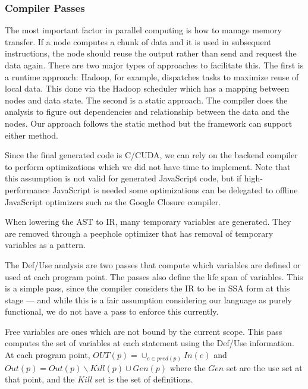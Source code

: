 \subsubsection{Compiler Passes}

The most important factor in parallel computing is how to manage memory
transfer. If a node computes a chunk of data and it is used in
subsequent instructions, the node should reuse the output rather than
send and request the data again. There are two major types of approaches to
facilitate
this. The first is a runtime approach: Hadoop, for example, dispatches
tasks to maximize reuse of local data. This done via the Hadoop
scheduler which has a mapping between nodes and data state.
The second is a static approach. The compiler does the analysis to figure out
dependencies and relationship between the data and the nodes. Our approach
follows the static method but the framework can support either method.
 
Since the final generated code is C/CUDA, we can rely on the backend compiler
	to perform optimizations which we did not have time
	to implement.
Note that this assumption is not valid for generated
	JavaScript code, but if high-performance JavaScript is needed
        some optimizations
	can be delegated to offline JavaScript optimizers such as the
	Google Closure\cite{bolin2010closure} compiler.



When lowering the AST to IR, many temporary variables are generated.
They are removed through a peephole optimizer that has removal of
	temporary variables as a pattern.


The Def/Use analysis are two passes that compute which variables are defined
	or used at each program point.
The passes also define the life span of variables.
This is a simple pass, since the compiler considers the IR to be in SSA form
 	at this stage --- and while this is a fair assumption considering our
	language as purely functional, we do not have a pass to enforce this currently.


Free variables are ones which are not bound by the current scope.
This pass computes the set of variables at each statement using
	the Def/Use information.
At each program point, $OUT(p) = \cup_{e \in pred(p)} In(e)$ and $Out(p) = Out(p) \backslash Kill(p) \cup Gen(p)$
	where the $Gen$ set are the use set at that point, and the $Kill$ set is the set
 of definitions.

